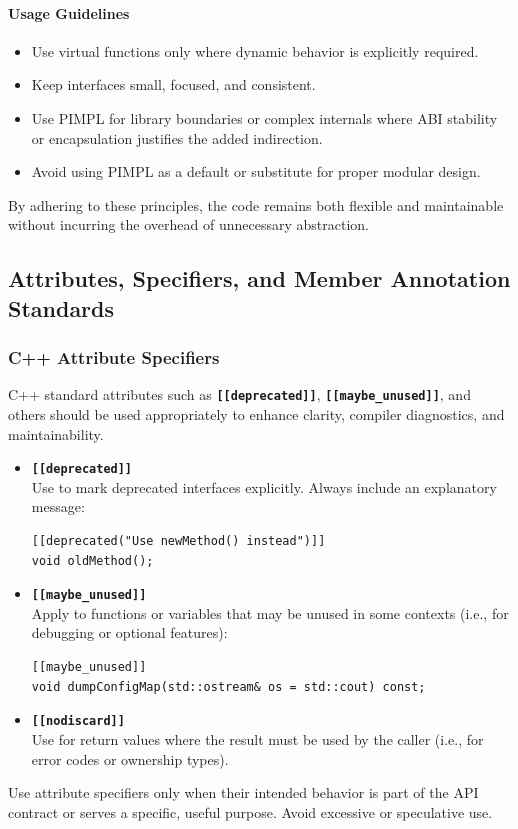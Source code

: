 \paragraph{Usage Guidelines}

\begin{itemize}\itemsep0em
    \item Use virtual functions only where dynamic behavior is explicitly required.
    \item Keep interfaces small, focused, and consistent.
    \item Use PIMPL for library boundaries or complex internals where ABI stability or encapsulation justifies the added indirection.
    \item Avoid using PIMPL as a default or substitute for proper modular design.
\end{itemize}

By adhering to these principles, the code remains both flexible and maintainable without incurring the overhead of unnecessary abstraction.



\subsection{Attributes, Specifiers, and Member Annotation Standards}

\subsubsection*{C++ Attribute Specifiers}

C++ standard attributes such as \texttt{\textbf{[[deprecated]]}}, \texttt{\textbf{[[maybe\_unused]]}}, and others should be used appropriately to enhance clarity, compiler diagnostics, and maintainability.
\begin{itemize}\itemsep0em
  \item \textbf{\texttt{[[deprecated]]}} \\
  Use to mark deprecated interfaces explicitly. Always include an explanatory message:
  \begin{lstlisting}[style=cppstyle]
[[deprecated("Use newMethod() instead")]]
void oldMethod();
  \end{lstlisting}

  \item \textbf{\texttt{[[maybe\_unused]]}} \\
  Apply to functions or variables that may be unused in some contexts (i.e., for debugging or optional features):
  \begin{lstlisting}[style=cppstyle]
[[maybe_unused]]
void dumpConfigMap(std::ostream& os = std::cout) const;
  \end{lstlisting}

  \item \textbf{\texttt{[[nodiscard]]}} \\
  Use for return values where the result must be used by the caller (i.e., for error codes or ownership types).
\end{itemize}
Use attribute specifiers only when their intended behavior is part of the API contract or serves a specific, useful purpose. Avoid excessive or speculative use.

